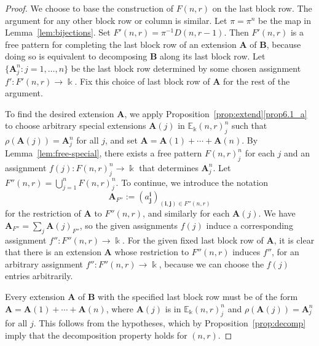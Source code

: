 \documentclass[ALCO,ThmDefs,Unicode,epreuves]{cedram}
\newcommand{\E}{\mathbb{E}}
\newcommand{\bi}{{\boldsymbol{i}}} %
\newcommand{\bj}{{\boldsymbol{j}}}
\newcommand{\bA}{\mathbf{A}}
\newcommand{\bB}{\mathbf{B}}
\begin{document}
\begin{proof} 
We choose to base the construction of $F(n,r)$ on the last block
row. The argument for any other block row or column is similar. Let
$\pi = \pi^n$ be the map in Lemma~\ref{lem:bijections}. Set $F'(n,r)
= \pi^{-1} D(n,r-1)$. Then $F'(n,r)$ is a free pattern for completing
the last block row of an extension $\bA$ of $\bB$, because doing so is
equivalent to decomposing $\bB$ along its last block row. Let $\{
\bA^n_j: j=1, \dots, n \}$ be the last block row determined by some
chosen assignment $f': F'(n,r) \to \Bbbk$. Fix this choice of last
block row of $\bA$ for the rest of the argument.

To find the desired extension $\bA$, we apply Proposition~\ref{prop:extend}\ref{prop6.1_a} to choose arbitrary special extensions $\bA(j)$
in $\E_\Bbbk(n,r)^n_j$ such that $\rho(\bA(j)) = \bA^n_j$ for all $j$,
and set $\bA = \bA(1) + \cdots + \bA(n)$. By Lemma~\ref{lem:free-special}, there exists a free pattern $F(n,r)^n_j$ for
each $j$ and an assignment $f(j): F(n,r)^n_j \to \Bbbk$ that
determines $\bA^n_j$. Let $F''(n,r) = \bigcup_{j=1}^n F(n,r)^n_j$. To
continue, we introduce the notation
\[
\bA_{F''} := (a^\bi_\bj)_{(\bi,\bj) \in F''(n,r)}
\]
for the restriction of $\bA$ to $F''(n,r)$, and similarly for each
$\bA(j)$. We have $\bA_{F''} = \sum_j \bA(j)_{F''}$, so the given
assignments $f(j)$ induce a corresponding assignment $f'': F''(n,r)
\to \Bbbk$. For the given fixed last block row of $\bA$, it is clear
that there is an extension $\bA$ whose restriction to $F''(n,r)$
induces $f''$, for an arbitrary assignment $f'': F''(n,r) \to \Bbbk$,
because we can choose the $f(j)$ entries arbitrarily.

Every extension $\bA$ of $\bB$ with the specified last block row must
be of the form $\bA = \bA(1)+\cdots +\bA(n)$, where $\bA(j)$ is in
$\E_\Bbbk(n,r)^n_j$ and $\rho(\bA(j)) = \bA^n_j$ for all $j$. This
follows from the hypotheses, which by Proposition~\ref{prop:decomp}
imply that the decomposition property holds for $(n,r)$.


\end{proof}
\end{document}
